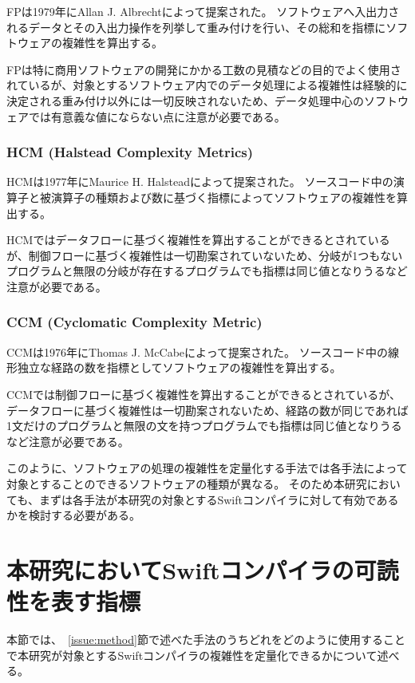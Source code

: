 FPは1979年にAllan J. Albrechtによって提案された。
ソフトウェアへ入出力されるデータとその入出力操作を列挙して重み付けを行い、その総和を指標にソフトウェアの複雑性を算出する。

FPは特に商用ソフトウェアの開発にかかる工数の見積などの目的でよく使用されているが、対象とするソフトウェア内でのデータ処理による複雑性は経験的に決定される重み付け以外には一切反映されないため、データ処理中心のソフトウェアでは有意義な値にならない点に注意が必要である。

\subsubsection{HCM (Halstead Complexity Metrics)}

HCMは1977年にMaurice H. Halsteadによって提案された。
ソースコード中の演算子と被演算子の種類および数に基づく指標によってソフトウェアの複雑性を算出する。

HCMではデータフローに基づく複雑性を算出することができるとされているが、制御フローに基づく複雑性は一切勘案されていないため、分岐が1つもないプログラムと無限の分岐が存在するプログラムでも指標は同じ値となりうるなど注意が必要である。

\subsubsection{CCM (Cyclomatic Complexity Metric)}

CCMは1976年にThomas J. McCabeによって提案された。
ソースコード中の線形独立な経路の数を指標としてソフトウェアの複雑性を算出する。

CCMでは制御フローに基づく複雑性を算出することができるとされているが、データフローに基づく複雑性は一切勘案されないため、経路の数が同じであれば1文だけのプログラムと無限の文を持つプログラムでも指標は同じ値となりうるなど注意が必要である。

\vspace{2em}

このように、ソフトウェアの処理の複雑性を定量化する手法では各手法によって対象とすることのできるソフトウェアの種類が異なる。
そのため本研究においても、まずは各手法が本研究の対象とするSwiftコンパイラに対して有効であるかを検討する必要がある。


\section{本研究においてSwiftコンパイラの可読性を表す指標}
\label{issue:barometer}

本節では、~\ref{issue:method}節で述べた手法のうちどれをどのように使用することで本研究が対象とするSwiftコンパイラの複雑性を定量化できるかについて述べる。

